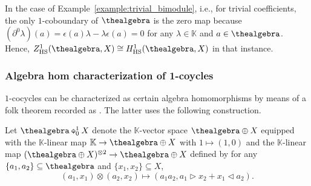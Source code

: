 \documentclass[10pt,a4paper]{amsart}
\numberwithin{equation}{section}
\newcommand{\diamondplus}{\mathbin{\ooalign{\hfil$\diamond$\hfil\cr\hfil$\scriptscriptstyle+$\hfil\cr}}}
\newcommand{\HSalgebraconstructdeform}[4]{#2\diamondplus^{#1}_{#4}#3}
\newcommand{\HScocycles}[3]{Z^{#1}_{\mathrm{HS}}(#2,#3)}
\newcommand{\HScohomology}[3]{H^{#1}_{\mathrm{HS}}(#2,#3)}
\newcommand{\Scounit}{\epsilon}
\newcommand{\Smonoidalproduct}{\otimes}
\newcommand{\fromto}[2]{#1 \to #2}
\newcommand{\Sdirectsum}{\oplus}
\newcommand{\Sleftmoduleaction}{\triangleright}
\newcommand{\Srightmoduleaction}{\triangleleft}
\newcommand{\thefield}{\mathbb{K}}
\newcommand{\themodule}{X}
\newcommand{\thecounit}{\Scounit}
\begin{document}
{\begin{Example}
  \label{remark:trivial_bimodule}
  \newcommand{\anyscalar}{\lambda}
  \newcommand{\anyop}{a}
  In the case of Example~\ref{example:trivial_bimodule}, i.e., for trivial coefficients, the only $1$-coboundary of $\thealgebra$ is the zero map because $(\partial^0\anyscalar)(\anyop)=\thecounit(\anyop)\anyscalar-\anyscalar\thecounit(\anyop)=0$ for any $\anyscalar\in\thefield$ and $\anyop\in\thealgebra$. Hence,  $\HScocycles{1}{\thealgebra}{\themodule}\cong\HScohomology{1}{\thealgebra}{\themodule}$ in that instance.
\end{Example}
\subsubsection{Algebra hom characterization of 1-coycles}
\label{section:hochschild-general-algebrahoms}
$1$-cocycles can be characterized as certain algebra homomorphisms by means of  a folk theorem recorded as  \cite[Lemma~1.9]{KyedRaum2017}. The latter uses the following construction.

{
    \newcommand{\thedeform}{c}
  \newcommand{\thedeformxx}[2]{c(#1 \Smonoidalproduct #2)}
  \newcommand{\thirda}{a_3}
        \newcommand{\firsta}{a_1}
      \newcommand{\firstx}{x_1}
      \newcommand{\seconda}{a_2}
      \newcommand{\secondx}{x_2}
      \begin{Definition}
        \label{definition:the-bfg-algebra}
    Let $\HSalgebraconstructdeform{1}{\thealgebra}{\themodule}{0}$ denote the  $\thefield$-vector space $\thealgebra\Sdirectsum\themodule$ equipped with the $\thefield$-linear map $\fromto{\thefield} \thealgebra\Sdirectsum\themodule$ with $1\mapsto (1,0)$ and the $\thefield$-linear map $\fromto{(\thealgebra\Sdirectsum\themodule)^{\Smonoidalproduct 2}}{\thealgebra\Sdirectsum\themodule}$ defined by     for any $\{\firsta,\seconda\}\subseteq \thealgebra$ and $\{\firstx,\secondx\}\subseteq \themodule$,
    \[
      (\firsta,\firstx)\Smonoidalproduct(\seconda,\secondx)\mapsto (\firsta\seconda,\firsta\Sleftmoduleaction\secondx+\firstx\Srightmoduleaction\seconda).
    \]
  \end{Definition}
}


}
\end{document}

